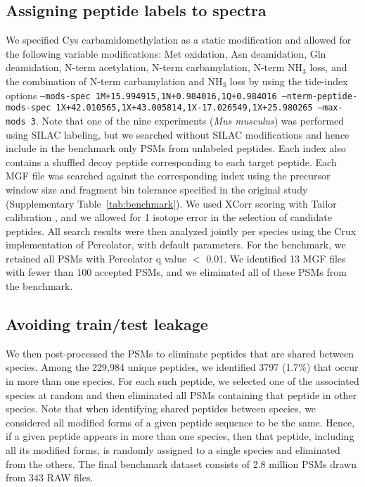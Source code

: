 \documentclass{article}
\begin{document}
\subsection*{Assigning peptide labels to spectra}

We specified Cys carbamidomethylation as a static modification and allowed for the following variable modifications: Met oxidation, Asn deamidation, Gln deamidation, N-term acetylation, N-term carbamylation, N-term NH$_{3}$ loss, and the combination of N-term carbamylation and NH$_{3}$ loss by using the tide-index options {\tt --mods-spec 1M+15.994915,\allowbreak 1N+0.984016,\allowbreak 1Q+0.984016 --nterm-peptide-mods-spec 1X+42.010565,\allowbreak 1X+43.005814,\allowbreak 1X-17.026549,\allowbreak 1X+25.980265 --max-mods 3}.
Note that one of the nine experiments (\textit{Mus musculus}) was performed using SILAC labeling, but we searched without SILAC modifications and hence include in the benchmark only PSMs from unlabeled peptides.
Each index also contains a shuffled decoy peptide corresponding to each target peptide.
Each MGF file was searched against the corresponding index using the precursor window size and fragment bin tolerance specified in the original study (Supplementary Table~\ref{tab:benchmark}).
We used XCorr scoring with Tailor calibration \cite{sulimov2020tailor}, and we allowed for 1 isotope error in the selection of candidate peptides.
All search results were then analyzed jointly per species using the Crux implementation of Percolator, with default parameters.
For the benchmark, we retained all PSMs with Percolator q value $<$ 0.01.
We identified 13 MGF files with fewer than 100 accepted PSMs, and we eliminated all of these PSMs from the benchmark.

\subsection*{Avoiding train/test leakage}

We then post-processed the PSMs to eliminate peptides that are shared between species.
Among the 229,984 unique peptides, we identified 3797 (1.7\%) that occur in more than one species.
For each such peptide, we selected one of the associated species at random and then eliminated all PSMs containing that peptide in other species.
Note that when identifying shared peptides between species, we
considered all modified forms of a given peptide sequence to be the
same.  Hence, if a given peptide appears in more than one species,
then that peptide, including all its modified forms, is randomly
assigned to a single species and eliminated from the others.
The final benchmark dataset consists of 2.8 million PSMs drawn from 343 RAW files.
\end{document}
